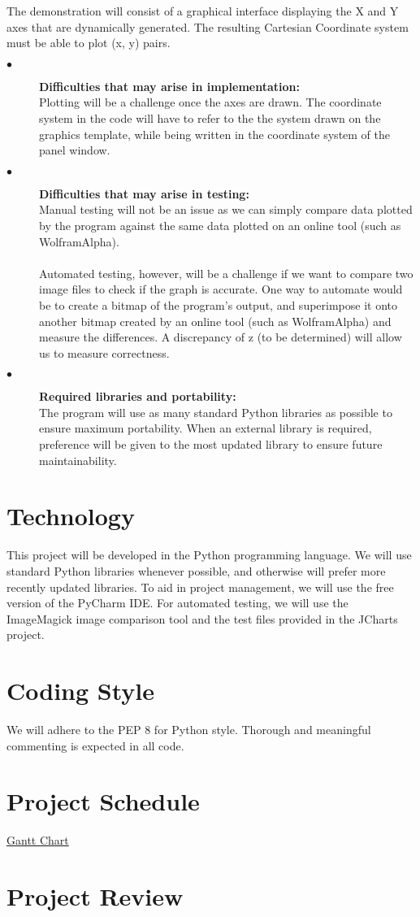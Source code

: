 \documentclass{article}
\begin{document}
The demonstration will consist of a graphical interface displaying the X and Y axes that are dynamically generated. The resulting Cartesian Coordinate system must be able to plot (x, y) pairs. 
\begin{description}
  \item[$\bullet$]  \textbf{Difficulties that may arise in implementation:} \\
  	Plotting will be a challenge once the axes are drawn. The coordinate system in the code will have to refer to the the system drawn on the graphics template, while being written in the coordinate system of the panel window. 

\item[$\bullet$]  \textbf{Difficulties that may arise in testing:} \\
Manual testing will not be an issue as we can simply compare data plotted by the program against the same data plotted on an online tool (such as WolframAlpha).\\ \\
Automated testing, however, will be a challenge if we want to compare two image files to check if the graph is accurate. One way to automate would be to create a bitmap of the program's output, and superimpose it onto another bitmap created by an online tool (such as WolframAlpha) and measure the differences. A discrepancy of z (to be determined) will allow us to measure correctness. 

\item[$\bullet$]  \textbf{Required libraries and portability:} \\
The program will use as many standard Python libraries as possible to ensure maximum portability. When an external library is required, preference will be given to the most updated library to ensure future maintainability. 

\end{description}

\section{Technology} %
This project will be developed in the Python programming language. We will use standard Python libraries whenever possible, and otherwise will prefer more recently updated libraries. To aid in project management, we will use the free version of the PyCharm IDE.  For automated testing, we will use the ImageMagick image comparison tool and the test files provided in the JCharts project.

\section{Coding Style} %
We will adhere to the PEP 8 for Python style. Thorough and meaningful commenting is expected in all code.

\section{Project Schedule}

 \href{run:GanttChart.gan} {Gantt Chart}

\section{Project Review} 
\end{document}
